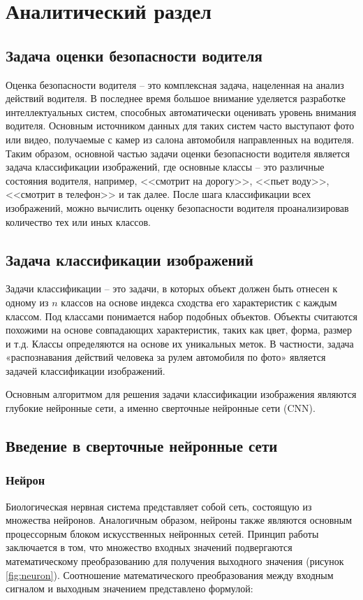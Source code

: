 \section{Аналитический раздел}
\subsection{Задача оценки безопасности водителя}
Оценка безопасности водителя -- это комплексная задача, нацеленная на анализ действий водителя. В последнее время большое внимание уделяется разработке интеллектуальных систем, способных автоматически оценивать уровень внимания водителя. Основным источником данных для таких систем часто выступают фото или видео, получаемые с камер из салона автомобиля направленных на водителя. Таким образом, основной частью задачи оценки безопасности водителя является задача классификации изображений, где основные классы -- это различные состояния водителя, например, <<смотрит на дорогу>>, <<пьет воду>>, <<смотрит в телефон>> и так далее. После шага классификации всех изображений, можно вычислить оценку безопасности водителя проанализировав количество тех или иных классов.

\subsection{Задача классификации изображений}
Задачи классификации -- это задачи, в которых объект должен быть отнесен к одному из $n$ классов на основе индекса сходства его характеристик с каждым классом. Под классами понимается набор подобных объектов. Объекты
считаются похожими на основе совпадающих характеристик, таких как цвет, форма, размер и т.д. Классы определяются на основе их уникальных меток. В частности, задача «распознавания действий человека за рулем автомобиля по фото» является задачей классификации изображений.

Основным алгоритмом для решения задачи классификации изображения являются глубокие нейронные сети, а именно сверточные нейронные сети (CNN).

\subsection{Введение в сверточные нейронные сети}
\subsubsection{Нейрон}

Биологическая нервная система представляет собой сеть, состоящую из множества нейронов. Аналогичным образом, нейроны также являются основным процессорным блоком искусственных нейронных сетей. Принцип работы заключается в том, что множество входных значений подвергаются математическому преобразованию для получения выходного значения (рисунок \ref{fig:neuron}). Соотношение математического преобразования между входным сигналом и выходным значением представлено формулой:

